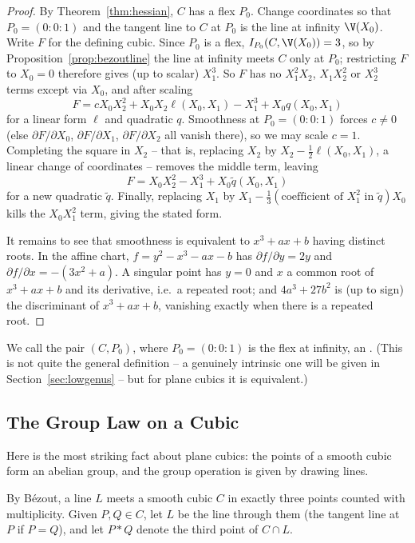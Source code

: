 \begin{proof}
	By Theorem~\ref{thm:hessian}, $C$ has a flex $P_0$. Change coordinates so that $P_0 = (0:0:1)$ and the tangent line to $C$ at $P_0$ is the line at infinity $\V(X_0)$. Write $F$ for the defining cubic. Since $P_0$ is a flex, $I_{P_0}(C,\V(X_0)) = 3$, so by Proposition~\ref{prop:bezoutline} the line at infinity meets $C$ only at $P_0$; restricting $F$ to $X_0 = 0$ therefore gives (up to scalar) $X_1^3$. So $F$ has no $X_1^2X_2$, $X_1X_2^2$ or $X_2^3$ terms except via $X_0$, and after scaling
	$$F = cX_0X_2^2 + X_0 X_2 \ell(X_0,X_1) - X_1^3 + X_0 q(X_0,X_1)$$
	for a linear form $\ell$ and quadratic $q$. Smoothness at $P_0 = (0:0:1)$ forces $c \neq 0$ (else $\partial F/\partial X_0$, $\partial F/\partial X_1$, $\partial F/\partial X_2$ all vanish there), so we may scale $c = 1$. Completing the square in $X_2$ -- that is, replacing $X_2$ by $X_2 - \tfrac12 \ell(X_0,X_1)$, a linear change of coordinates -- removes the middle term, leaving
	$$F = X_0X_2^2 - X_1^3 + X_0\tilde q(X_0,X_1)$$
	for a new quadratic $\tilde q$. Finally, replacing $X_1$ by $X_1 - \tfrac13(\text{coefficient of } X_1^2 \text{ in } \tilde q)X_0$ kills the $X_0X_1^2$ term, giving the stated form.

	It remains to see that smoothness is equivalent to $x^3+ax+b$ having distinct roots. In the affine chart, $f = y^2 - x^3-ax-b$ has $\partial f/\partial y = 2y$ and $\partial f/\partial x = -(3x^2+a)$. A singular point has $y = 0$ and $x$ a common root of $x^3+ax+b$ and its derivative, i.e.\ a repeated root; and $4a^3+27b^2$ is (up to sign) the discriminant of $x^3+ax+b$, vanishing exactly when there is a repeated root.
\end{proof}

We call the pair $(C,P_0)$, where $P_0 = (0:0:1)$ is the flex at infinity, an . (This is not quite the general definition -- a genuinely intrinsic one will be given in Section~\ref{sec:lowgenus} -- but for plane cubics it is equivalent.)

\subsection{The Group Law on a Cubic}

Here is the most striking fact about plane cubics: the points of a smooth cubic form an abelian group, and the group operation is given by drawing lines.

By B\'ezout, a line $L$ meets a smooth cubic $C$ in exactly three points counted with multiplicity. Given $P,Q \in C$, let $L$ be the line through them (the tangent line at $P$ if $P = Q$), and let $P * Q$ denote the third point of $C \cap L$.

